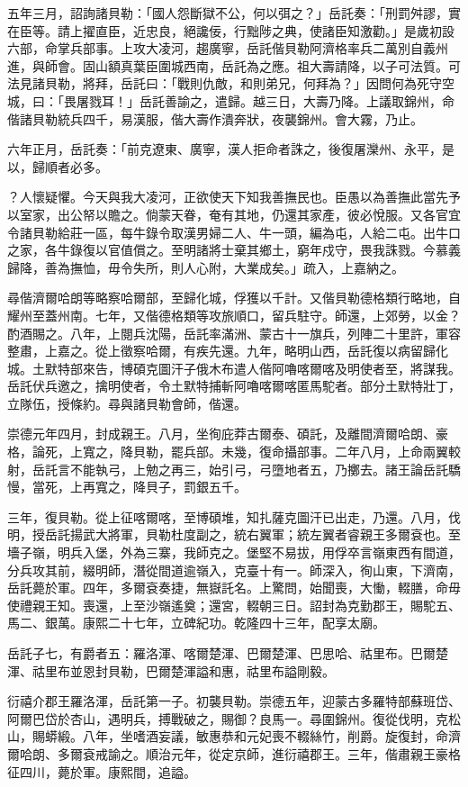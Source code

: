 \begin{pinyinscope}
五年三月，詔詢諸貝勒：「國人怨斷獄不公，何以弭之？」岳託奏：「刑罰舛謬，實在臣等。請上擢直臣，近忠良，絕讒佞，行黜陟之典，使諸臣知激勸。」是歲初設六部，命掌兵部事。上攻大凌河，趨廣寧，岳託偕貝勒阿濟格率兵二萬別自義州進，與師會。固山額真葉臣圍城西南，岳託為之應。祖大壽請降，以子可法質。可法見諸貝勒，將拜，岳託曰：「戰則仇敵，和則弟兄，何拜為？」因問何為死守空城，曰：「畏屠戮耳！」岳託善諭之，遣歸。越三日，大壽乃降。上議取錦州，命偕諸貝勒統兵四千，易漢服，偕大壽作潰奔狀，夜襲錦州。會大霧，乃止。

六年正月，岳託奏：「前克遼東、廣寧，漢人拒命者誅之，後復屠灤州、永平，是以，歸順者必多。

？人懷疑懼。今天與我大凌河，正欲使天下知我善撫民也。臣愚以為善撫此當先予以室家，出公帑以贍之。倘蒙天眷，奄有其地，仍還其家產，彼必悅服。又各官宜令諸貝勒給莊一區，每牛錄令取漢男婦二人、牛一頭，編為屯，人給二屯。出牛口之家，各牛錄復以官值償之。至明諸將士棄其鄉土，窮年戍守，畏我誅戮。今慕義歸降，善為撫恤，毋令失所，則人心附，大業成矣。」疏入，上嘉納之。

尋偕濟爾哈朗等略察哈爾部，至歸化城，俘獲以千計。又偕貝勒德格類行略地，自耀州至蓋州南。七年，又偕德格類等攻旅順口，留兵駐守。師還，上郊勞，以金？酌酒賜之。八年，上閱兵沈陽，岳託率滿洲、蒙古十一旗兵，列陣二十里許，軍容整肅，上嘉之。從上徵察哈爾，有疾先還。九年，略明山西，岳託復以病留歸化城。土默特部來告，博碩克圖汗子俄木布遣人偕阿嚕喀爾喀及明使者至，將謀我。岳託伏兵邀之，擒明使者，令土默特捕斬阿嚕喀爾喀匿馬駝者。部分土默特壯丁，立隊伍，授條約。尋與諸貝勒會師，偕還。

崇德元年四月，封成親王。八月，坐徇庇莽古爾泰、碩託，及離間濟爾哈朗、豪格，論死，上寬之，降貝勒，罷兵部。未幾，復命攝部事。二年八月，上命兩翼較射，岳託言不能執弓，上勉之再三，始引弓，弓墮地者五，乃擲去。諸王論岳託驕慢，當死，上再寬之，降貝子，罰銀五千。

三年，復貝勒。從上征喀爾喀，至博碩堆，知扎薩克圖汗已出走，乃還。八月，伐明，授岳託揚武大將軍，貝勒杜度副之，統右翼軍；統左翼者睿親王多爾袞也。至墻子嶺，明兵入堡，外為三寨，我師克之。堡堅不易拔，用俘卒言嶺東西有間道，分兵攻其前，綴明師，潛從間道逾嶺入，克臺十有一。師深入，徇山東，下濟南，岳託薨於軍。四年，多爾袞奏捷，無嶽託名。上驚問，始聞喪，大慟，輟膳，命毋使禮親王知。喪還，上至沙嶺遙奠；還宮，輟朝三日。詔封為克勤郡王，賜駝五、馬二、銀萬。康熙二十七年，立碑紀功。乾隆四十三年，配享太廟。

岳託子七，有爵者五：羅洛渾、喀爾楚渾、巴爾楚渾、巴思哈、祜里布。巴爾楚渾、祜里布並恩封貝勒，巴爾楚渾謚和惠，祜里布謚剛毅。

衍禧介郡王羅洛渾，岳託第一子。初襲貝勒。崇德五年，迎蒙古多羅特部蘇班岱、阿爾巴岱於杏山，遇明兵，搏戰破之，賜御？良馬一。尋圍錦州。復從伐明，克松山，賜蟒緞。八年，坐嗜酒妄議，敏惠恭和元妃喪不輟絲竹，削爵。旋復封，命濟爾哈朗、多爾袞戒諭之。順治元年，從定京師，進衍禧郡王。三年，偕肅親王豪格征四川，薨於軍。康熙間，追謚。


\end{pinyinscope}
